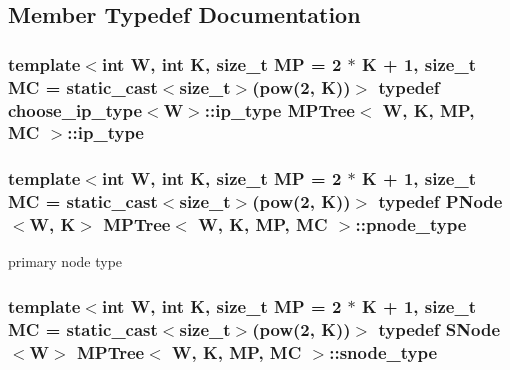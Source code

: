 \subsection{Member Typedef Documentation}
\hypertarget{classMPTree_a11032357a52017ffa6ad4e7ddedf3c23}{
\subsubsection[{ip\-\_\-type}]{\setlength{\rightskip}{0pt plus 5cm}template$<$int W, int K, size\-\_\-t M\-P = 2 $\ast$ K + 1, size\-\_\-t M\-C = static\-\_\-cast$<$size\-\_\-t$>$(pow(2, K))$>$ typedef {\bf choose\-\_\-ip\-\_\-type}$<${\bf W}$>$\-::{\bf ip\-\_\-type} {\bf M\-P\-Tree}$<$ {\bf W}, K, M\-P, M\-C $>$\-::{\bf ip\-\_\-type}\hspace{0.3cm}{\ttfamily [private]}}}\label{classMPTree_a11032357a52017ffa6ad4e7ddedf3c23}
\hypertarget{classMPTree_aaccc544aa2a8703f51ca45951f37a279}{
\subsubsection[{pnode\-\_\-type}]{\setlength{\rightskip}{0pt plus 5cm}template$<$int W, int K, size\-\_\-t M\-P = 2 $\ast$ K + 1, size\-\_\-t M\-C = static\-\_\-cast$<$size\-\_\-t$>$(pow(2, K))$>$ typedef {\bf P\-Node}$<${\bf W}, K$>$ {\bf M\-P\-Tree}$<$ {\bf W}, K, M\-P, M\-C $>$\-::{\bf pnode\-\_\-type}\hspace{0.3cm}{\ttfamily [private]}}}\label{classMPTree_aaccc544aa2a8703f51ca45951f37a279}


primary node type 

\hypertarget{classMPTree_a456aa661f3322ceae1d38bfbb39b572c}{
\subsubsection[{snode\-\_\-type}]{\setlength{\rightskip}{0pt plus 5cm}template$<$int W, int K, size\-\_\-t M\-P = 2 $\ast$ K + 1, size\-\_\-t M\-C = static\-\_\-cast$<$size\-\_\-t$>$(pow(2, K))$>$ typedef {\bf S\-Node}$<${\bf W}$>$ {\bf M\-P\-Tree}$<$ {\bf W}, K, M\-P, M\-C $>$\-::{\bf snode\-\_\-type}\hspace{0.3cm}{\ttfamily [private]}}}\label{classMPTree_a456aa661f3322ceae1d38bfbb39b572c}



